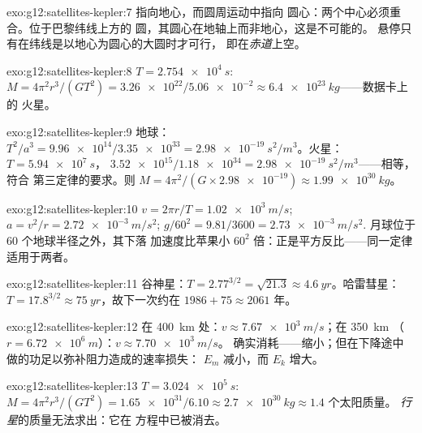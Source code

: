 \begin{solution}{exo:g12:satellites-kepler:7}
指向地心，而圆周运动中指向
圆心：两个中心必须重合。位于巴黎纬线上方的
圆，其圆心在地轴上而非地心，这是不可能的。
悬停只有在纬线是以地心为圆心的大圆时才可行，
即在\emph{赤道}上空。
\end{solution}

\begin{solution}{exo:g12:satellites-kepler:8}
$T = \qty{2.754e4}{s}$: $M = 4\pi^2 r^3/(GT^2) =
\num{3.26e22}/\num{5.06e-2} \approx \qty{6.4e23}{kg}$——数据卡上的
火星。
\end{solution}

\begin{solution}{exo:g12:satellites-kepler:9}
地球：$T^2/a^3 = \num{9.96e14}/\num{3.35e33} =
\qty{2.98e-19}{s^2/m^3}$。火星：$T = \qty{5.94e7}{s}$，
$\num{3.52e15}/\num{1.18e34} = \qty{2.98e-19}{s^2/m^3}$——相等，符合
第三定律的要求。则 $M = 4\pi^2/(G \times \num{2.98e-19})
\approx \qty{1.99e30}{kg}$。
\end{solution}

\begin{solution}{exo:g12:satellites-kepler:10}
$v = 2\pi r/T = \qty{1.02e3}{m/s}$; $a = v^2/r =
\qty{2.72e-3}{m/s^2}$; $g/60^2 = 9.81/3600 = \qty{2.73e-3}{m/s^2}$.
月球位于 $60$ 个地球半径之外，其下落
加速度比苹果小 $60^2$ 倍：正是平方反比——同一定律
适用于两者。
\end{solution}

\begin{solution}{exo:g12:satellites-kepler:11}
谷神星：$T = 2.77^{3/2} = \sqrt{21.3} \approx \qty{4.6}{yr}$。哈雷彗星：
$T = 17.8^{3/2} \approx \qty{75}{yr}$，故下一次约在
$1986 + 75 \approx 2061$ 年。
\end{solution}

\begin{solution}{exo:g12:satellites-kepler:12}
在 \qty{400}{km} 处：$v \approx \qty{7.67e3}{m/s}$；在 \qty{350}{km}
（$r = \qty{6.72e6}{m}$）：$v \approx \qty{7.70e3}{m/s}$。
确实消耗——缩小；但在下降途中
做的功足以弥补阻力造成的速率损失：
$E_m$ 减小，而 $E_k$ 增大。
\end{solution}

\begin{solution}{exo:g12:satellites-kepler:13}
$T = \qty{3.024e5}{s}$: $M = 4\pi^2 r^3/(GT^2) =
\num{1.65e31}/6.10 \approx \qty{2.7e30}{kg} \approx 1.4$ 个太阳质量。
\emph{行星}的质量无法求出：它在
方程中已被消去。
\end{solution}


